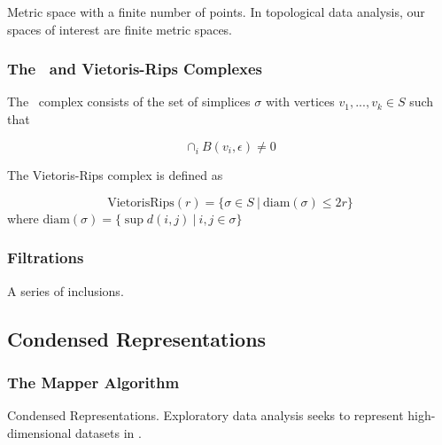 Metric space with a finite number of points.
In topological data analysis, our spaces of interest are finite metric spaces.

\subsubsection{The \Cech\ and Vietoris-Rips Complexes}

The \Cech\ complex consists of the set of simplices $\sigma$ with vertices $v_{1},...,v_{k}\in S$ such that

\begin{equation}
\displaystyle\cap_{i}^{} B(v_{i},\epsilon)\neq0
\end{equation}

The Vietoris-Rips complex is defined as

\begin{equation}
\mathrm{VietorisRips}(r) = \{ \sigma\in S\:|\:\mathrm{diam}(\sigma) \leq 2r \}
\end{equation}
where $\mathrm{diam}(\sigma)=\{ \sup d(i,j) \:|\: i,j\in\sigma \}$

\subsubsection{Filtrations}

A series of inclusions.

\subsection{Condensed Representations}

\subsubsection{The Mapper Algorithm}
\label{subsec:mapper}

Condensed Representations.
Exploratory data analysis seeks to represent high-dimensional datasets in .

